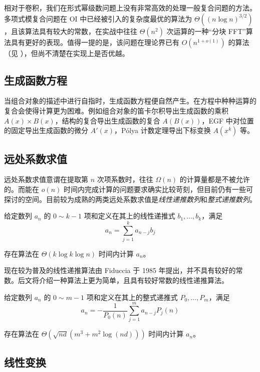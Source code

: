 相对于卷积，我们在形式幂级数问题上没有非常高效的处理一般复合问题的方法。多项式模复合问题在 OI 中已经被引入的复杂度最优的算法为 $\Theta((n\log n)^{3/2})$，且该算法具有较大的常数，在实战中往往 $\Theta(n^2)$ 次运算的一种“分块 FFT”算法具有更好的表现。值得一提的是，该问题在理论界已有 $O(n^{1+o(1)})$ 的算法（见 \cite{polyfact}），但尚不清楚在实现上是否优越。

\subsection{生成函数方程}

当组合对象的描述中进行自指时，生成函数方程便自然产生。在方程中种种运算的复合会使得计算更为困难。例如组合对象的笛卡尔积导出生成函数的乘积 $A(x)\times B(x)$，结构的复合导出生成函数的复合 $A(B(x))$，EGF 中对位置的固定导出生成函数的微分 $A'(x)$，P\'olya 计数定理导出下标变换 $A(x^k)$ 等。

\subsection{远处系数求值}

远处系数求值意谓在提取第 $n$ 次项系数时，往往 $\Omega(n)$ 的计算量都是不被允许的。而能在 $o(n)$ 时间内完成计算的问题要求确实比较苛刻，但目前仍有一些可探讨的空间。目前较为成熟的两类远处系数求值是\emph{线性递推数列}和\emph{整式递推数列}。

\begin{theorem}给定数列 $a_n$ 的 $0\sim k-1$ 项和定义在其上的线性递推式 $b_1,\dots, b_k$，满足
$$ a_n = \sum_{j=1}^k a_{n-j} b_j $$

存在算法在 $\Theta(k\log k\log n)$ 时间内计算 $a_n$。
\end{theorem}

现在较为普及的线性递推算法由 Fiduccia 于 1985 年提出，并不具有较好的常数。后文将介绍一种算法上更为简单，且具有较好常数的线性递推算法。

\begin{theorem}给定数列 $a_n$ 的 $0\sim m-1$ 项和定义在其上的整式递推式 $P_0,\dots,P_m$，满足
$$ a_n = -\frac1{P_0(n)}\sum_{j=1}^m a_{n-j}P_j(n) $$

存在算法在 $\Theta \left(\sqrt{nd}\left(m^3+m^2\log(nd)\right)\right)$ 时间内计算 $a_n$。
\end{theorem}

\subsection{线性变换}


